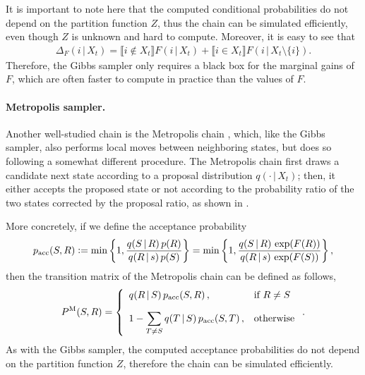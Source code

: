 It is important to note here that the computed conditional probabilities do not depend on the partition function $Z$, thus the chain can be simulated efficiently, even though $Z$ is unknown and hard to compute.
Moreover, it is easy to see that
\begin{align*}
\Delta_F(i \,|\, X_t) = \llbracket i\not\in X_t\rrbracket F(i \,|\, X_t) + \llbracket i\in X_t\rrbracket F(i \,|\, X_t\setminus\{i\}).
\end{align*}
Therefore, the Gibbs sampler only requires a black box for the marginal gains of $F$, which are often faster to compute in practice than the values of $F$.

\paragraph{Metropolis sampler.}
Another well-studied chain is the Metropolis chain \citep{metropolis,hastings}, which, like the Gibbs sampler, also performs local moves between neighboring states, but does so following a somewhat different procedure.
The Metropolis chain first draws a candidate next state according to a proposal distribution $q(\cdot\,|\,X_t)$; then, it either accepts the proposed state or not according to the probability ratio of the two states corrected by the proposal ratio, as shown in .


More concretely, if we define the acceptance probability
\begin{align*}
  p_{\textrm{acc}}(S, R) \vcentcolon= \min\left\{1, \displaystyle\frac{q(S \,|\, R)\,p(R)}{q(R \,|\, s)\,p(S)}\right\} = \min\left\{1, \displaystyle\frac{q(S \,|\, R)\,\exp(F(R))}{q(R \,|\, s)\,\exp(F(S))}\right\},
\end{align*}
then the transition matrix of the Metropolis chain can be defined as follows,
\begin{align*}
  \Pm(S, R) = \twopartdefo{q(R \,|\, S)\,p_{\textrm{acc}}(S, R)}{R \neq S\vspace{1em}}{1 - \displaystyle\sum_{T \neq S} q(T \,|\, S)\,p_{\textrm{acc}}(S, T)}.
\end{align*}
As with the Gibbs sampler, the computed acceptance probabilities do not depend on the partition function $Z$, therefore the chain can be simulated efficiently.

